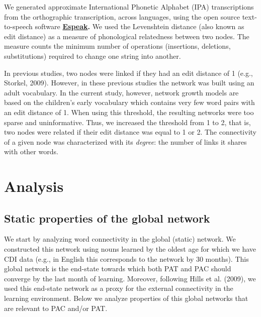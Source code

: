 \documentclass[english,floatsintext,man]{apa6}
\theoremstyle{definition}
\theoremstyle{definition}
\theoremstyle{definition}
\theoremstyle{remark}
\begin{document}
We generated approximate International Phonetic Alphabet (IPA)
transcriptions from the orthographic transcription, across languages,
using the open source text-to-speech software
\textbf{\href{http://http://espeak.sourceforge.net/}{Espeak}.} We used
the Levenshtein distance (also known as edit distance) as a measure of
phonological relatedness between two nodes. The measure counts the
minimum number of operations (insertions, deletions, substitutions)
required to change one string into another.

In previous studies, two nodes were linked if they had an edit distance
of 1 (e.g., Storkel, 2009). However, in these previous studies the
network was built using an adult vocabulary. In the current study,
however, network growth models are based on the children's early
vocabulary which contains very few word pairs with an edit distance of
1. When using this threshold, the resulting networks were too sparse and
uninformative. Thus, we increased the threshold from 1 to 2, that is,
two nodes were related if their edit distance was equal to 1 or 2. The
connectivity of a given node was characterized with its \emph{degree}:
the number of links it shares with other words.

\section{Analysis}\label{analysis}

\subsection{Static properties of the global
network}\label{static-properties-of-the-global-network}

We start by analyzing word connectivity in the global (static) network.
We constructed this network using nouns learned by the oldest age for
which we have CDI data (e.g., in English this corresponds to the network
by 30 months). This global network is the end-state towards which both
PAT and PAC should converge by the last month of learning. Moreover,
following Hills et al. (2009), we used this end-state network as a proxy
for the external connectivity in the learning environment. Below we
analyze properties of this global networks that are relevant to PAC
and/or PAT.
\end{document}
